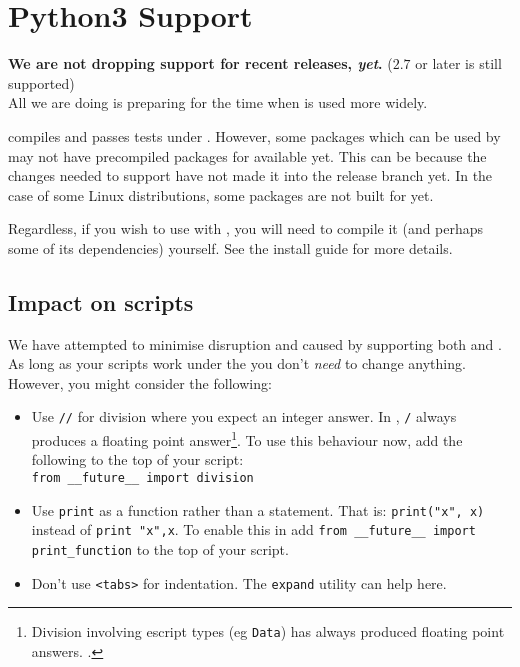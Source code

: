 
%
%
%

\chapter{Python3 Support}\label{app:py3}

\textbf{We are not dropping support for recent \pythontwo releases, \textsl{yet}.} ($2.7$ or later is still supported) \\
All we are doing is preparing for the time when \pythonthree is used more widely.

\escript compiles and passes tests under \pythonthree.
However, some packages which can be used by \escript may not have precompiled packages for \pythonthree available yet.
This can be because the changes needed to support \pythonthree have not made it into the 
release branch yet. 
In the case of some Linux distributions, some packages are not built for \pythonthree yet.

Regardless, if you wish to use \escript with \pythonthree, you will need to compile it (and perhaps some of
its dependencies) yourself.
See the install guide for more details. 

\section{Impact on scripts}
We have attempted to minimise disruption and caused by supporting both \pythontwo and \pythonthree.
As long as your scripts work under the \pythontwo you don't \emph{need} to change anything.
However, you might consider the following:
\begin{itemize}
 \item Use \texttt{//} for division where you expect an integer answer. 
In \pythonthree, \texttt{/} always produces a floating point answer\footnote{Division involving escript types (eg \texttt{Data}) has always produced floating point answers. 
.}.
To use this behaviour now, add the following to the top of your script:\\
\texttt{from __future__ import division}
\item Use \texttt{print} as a function rather than a statement.
That is:  \texttt{print("x", x)}  instead of \texttt{print "x",x}.
To enable this in \pythontwo add \texttt{from __future__ import print_function} to the top of your script.
\item{Don't use \verb|<tabs>| for indentation.  The \texttt{expand} utility can help here.}
\end{itemize}

